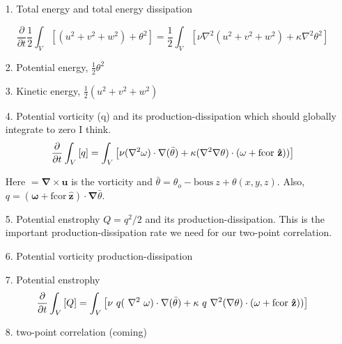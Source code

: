 \documentclass[12pt]{article}
\begin{document}
\begin{itemize}
\item[1.] Total energy and total energy dissipation

\begin{equation}
\frac{\partial}{\partial t} \frac{1}{2} \int_V  
         \left[  (u^2 + v^2 + w^2) +   \theta^2\right]  
= \frac{1}{2}\int_V \left[  \nu \nabla^2 (u^2 + v^2 + w^2)  
                     + \kappa \nabla^2 \theta^2
                         \right] 
\end{equation}

\item[2.] Potential energy, $\frac{1}{2} \theta^2$ 

\item[3.] Kinetic energy, $\frac{1}{2} ( u^2 + v^2 + w^2 )$ 
  
\item[4.] Potential vorticity (q) and its production-dissipation which
  should globally integrate to zero I think.
  \begin{equation}
  \frac{\partial}{\partial t} \int_V   
           \left[ q \right]  
  = \int_V \left[ \nu (\nabla^2 \mathbf\omega) \cdot \mathbf{\nabla}
    (\bar{\theta})
                       + \kappa (\nabla^2 \mathbf{\nabla} \theta) \cdot  
                       (\mathbf\omega  
                       + \text{fcor} ~{\bf{\hat{z}}} ))  
                           \right]  
  \end{equation}
  
  Here $\mathbf = \mathbf\nabla \times \mathbf u$ is the vorticity and
  $\bar\theta = \theta_o -\text{bous}~ z + \theta(x,y,z)$. Also, $q =
  (\mathbf\omega + \text{fcor}~\mathbf{\hat{z}}) \cdot \mathbf\nabla
  \bar\theta.$

\item[5.] Potential enstrophy $Q = q^2/2$ and its
  production-dissipation. This is the important production-dissipation
  rate we need for our two-point correlation.

\item[6.] Potential vorticity production-dissipation

\item[7.] Potential enstrophy
  \begin{equation} 
    \frac{\partial}{\partial t} \int_V   \left[ Q \right]   
    = \int_V \left[ \nu  ~q (~\nabla^2 ~\mathbf\omega) \cdot \mathbf{\nabla}
      (\bar{\theta})   
      + \kappa  ~q ~\nabla^2 (\mathbf{\nabla} \theta) \cdot  
      (\mathbf\omega   
      + \text{fcor} ~{\bf{\hat{z}}} ))   
    \right]   
  \end{equation} 

\item[8.] two-point correlation (coming)

\end{itemize}
\end{document}
